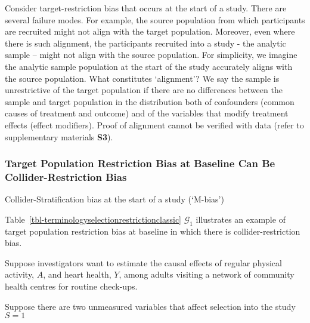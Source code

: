 \documentclass[
  single column]{article}
\begin{document}
Consider target-restriction bias that occurs at the start of a study.
There are several failure modes. For example, the source population from
which participants are recruited might not align with the target
population. Moreover, even where there is such alignment, the
participants recruited into a study - the analytic sample -- might not
align with the source population. For simplicity, we imagine the
analytic sample population at the start of the study accurately aligns
with the source population. What constitutes `alignment'? We say the
sample is unrestrictive of the target population if there are no
differences between the sample and target population in the distribution
both of confounders (common causes of treatment and outcome) and of the
variables that modify treatment effects (effect modifiers). Proof of
alignment cannot be verified with data (refer to supplementary materials
\textbf{S3}).

\subsubsection{Target Population Restriction Bias at Baseline Can Be
Collider-Restriction
Bias}\label{target-population-restriction-bias-at-baseline-can-be-collider-restriction-bias}

\begin{table}

\caption{\label{tbl-terminologyselectionrestrictionclassic}Collider-Stratification
bias at the start of a study (`M-bias')}

\centering{

\terminologyselectionrestrictionclassic

}

\end{table}%

Table~\ref{tbl-terminologyselectionrestrictionclassic} \(\mathcal{G}_1\)
illustrates an example of target population restriction bias at baseline
in which there is collider-restriction bias.

Suppose investigators want to estimate the causal effects of regular
physical activity, \(A\), and heart health, \(Y\), among adults visiting
a network of community health centres for routine check-ups.

Suppose there are two unmeasured variables that affect selection into
the study \(S=1\)
\end{document}
